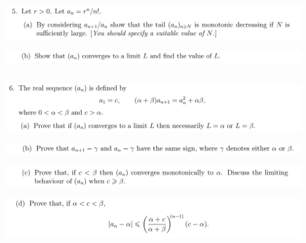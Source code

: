 \documentclass[12pt]{article}
\begin{document}
\newpage
\subsection{}
\begin{mdframed}
\includegraphics[width=400pt]{img/oxford-M2-analysis-I-4-5-a.png}
\end{mdframed}
\begin{mdframed}
\includegraphics[width=400pt]{img/oxford-M2-analysis-I-4-5-b.png}
\end{mdframed}

\newpage
\subsection{}
\begin{mdframed}
\includegraphics[width=400pt]{img/oxford-M2-analysis-I-4-6-a.png}
\end{mdframed}
\begin{mdframed}
\includegraphics[width=400pt]{img/oxford-M2-analysis-I-4-6-b.png}
\end{mdframed}
\begin{mdframed}
\includegraphics[width=400pt]{img/oxford-M2-analysis-I-4-6-c.png}
\end{mdframed}
\begin{mdframed}
\includegraphics[width=400pt]{img/oxford-M2-analysis-I-4-6-d.png}
\end{mdframed}
\end{document}

